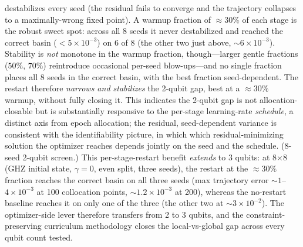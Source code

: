 \documentclass[11pt]{article}
\begin{document}
destabilizes every seed (the residual fails to converge and the trajectory collapses to a maximally-wrong fixed point). A warmup fraction of $\approx\!30\%$ of each stage is the robust sweet spot: across all 8 seeds it never destabilized and reached the correct basin ($<5\times10^{-3}$) on 6 of 8 (the other two just above, $\sim\!6\times10^{-3}$). Stability is \emph{not} monotone in the warmup fraction, though---larger gentle fractions ($50\%$, $70\%$) reintroduce occasional per-seed blow-ups---and no single fraction places all 8 seeds in the correct basin, with the best fraction seed-dependent. The restart therefore \emph{narrows and stabilizes} the 2-qubit gap, best at a $\approx\!30\%$ warmup, without fully closing it. This indicates the 2-qubit gap is not allocation-closable but is substantially responsive to the per-stage learning-rate \emph{schedule}, a distinct axis from epoch allocation; the residual, seed-dependent variance is consistent with the identifiability picture, in which which residual-minimizing solution the optimizer reaches depends jointly on the seed and the schedule. (8-seed 2-qubit screen.) This per-stage-restart benefit \emph{extends} to 3 qubits: at 8$\times$8 (GHZ initial state, $\gamma=0$, even split, three seeds), the restart at the $\approx\!30\%$ fraction reaches the correct basin on all three seeds (max trajectory error $\sim\!1$--$4\times10^{-3}$ at 100 collocation points, $\sim\!1.2\times10^{-3}$ at 200), whereas the no-restart baseline reaches it on only one of the three (the other two at $\sim\!3\times10^{-2}$). The optimizer-side lever therefore transfers from 2 to 3 qubits, and the constraint-preserving curriculum methodology closes the local-vs-global gap across every qubit count tested.
\end{document}
